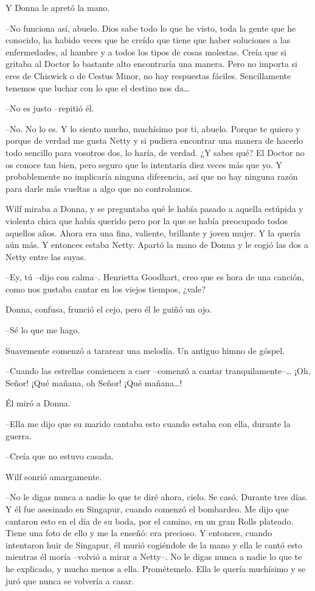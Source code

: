 Y Donna le apretó la mano.

--No funciona así, abuelo. Dios sabe todo lo que he visto, toda la gente
que he conocido, ha habido veces que he creído que tiene que haber
soluciones a las enfermedades, al hambre y a todos los tipos de cosas
molestas. Creía que si gritaba al Doctor lo bastante alto encontraría
una manera. Pero no importa si eres de Chiswick o de Cestus Minor, no
hay respuestas fáciles. Sencillamente tenemos que luchar con lo que el
destino nos da\ldots{}

--No es justo --repitió él.

--No. No lo es. Y lo siento mucho, muchísimo por ti, abuelo. Porque te
quiero y porque de verdad me gusta Netty y si pudiera encontrar una
manera de hacerlo todo sencillo para vosotros dos, lo haría, de verdad.
¿Y sabes qué? El Doctor no os conoce tan bien, pero seguro que lo
intentaría diez veces más que yo. Y probablemente no implicaría ninguna
diferencia, así que no hay ninguna razón para darle más vueltas a  algo
que no controlamos.

Wilf miraba a Donna, y se preguntaba qué le había pasado a aquella
estúpida y violenta chica que había querido pero por la que se había
preocupado todos aquellos años. Ahora era una fina, valiente, brillante
y joven mujer. Y la quería aún más. Y entonces estaba Netty. Apartó la
mano de Donna y le cogió las dos a Netty entre las suyas.

--Ey, tú --dijo con calma--. Henrietta Goodhart, creo que es hora de una
canción, como nos gustaba cantar en los viejos tiempos, ¿vale?

Donna, confusa, frunció el cejo, pero él le guiñó un ojo.

--Sé lo que me hago.

Suavemente comenzó a tararear una melodía. Un antiguo himno de góspel.

--Cuando las estrellas comiencen a caer --comenzó a cantar
tranquilamente--\ldots{} ¡Oh, Señor! ¡Qué mañana, oh Señor! ¡Qué
mañana\ldots{}!

Él miró a Donna.

--Ella me dijo que su marido cantaba esto cuando estaba con ella,
durante la guerra.

--Creía que no estuvo casada.

Wilf sonrió amargamente.

--No le digas nunca a nadie lo que te diré ahora, cielo. Se casó.
Durante tres días. Y él fue asesinado en Singapur, cuando comenzó el
bombardeo. Me dijo que cantaron esto en el día de su boda, por el
camino, en un gran Rolls plateado. Tiene una foto de ello y me la
enseñó: era precioso. Y entonces, cuando intentaron huir de Singapur, él
murió cogiéndole de la mano y ella le cantó esto mientras él
moría  --volvió a mirar a Netty--. No le digas nunca a nadie lo que te he
explicado, y mucho menos a ella. Prométemelo. Ella le quería muchísimo y
se juró que nunca se volvería a casar.

